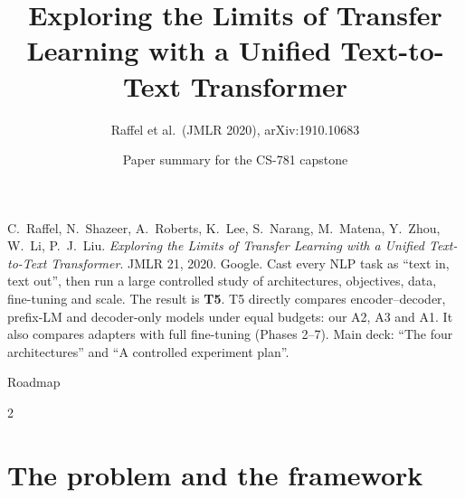 \documentclass[aspectratio=169,11pt]{beamer}
\title[T5]{Exploring the Limits of Transfer Learning with a Unified Text-to-Text Transformer}
\subtitle{Raffel et al.\ (JMLR 2020), arXiv:1910.10683}
\author[Paper summary]{Paper summary for the CS-781 capstone}
\date{}
\begin{document}
\begin{frame}\titlepage\end{frame}

\paperglance
{C.\ Raffel, N.\ Shazeer, A.\ Roberts, K.\ Lee, S.\ Narang, M.\ Matena, Y.\ Zhou, W.\ Li, P.\ J.\ Liu. \emph{Exploring the Limits of Transfer Learning with a Unified Text-to-Text Transformer}. JMLR 21, 2020. Google.}
{Cast every NLP task as ``text in, text out'', then run a large controlled study of architectures, objectives, data, fine-tuning and scale. The result is \textbf{T5}.}
{T5 directly compares encoder--decoder, prefix-LM and decoder-only models under equal budgets: our A2, A3 and A1. It also compares adapters with full fine-tuning (Phases 2--7).}
{Main deck: ``The four architectures'' and ``A controlled experiment plan''.}

\begin{frame}{Roadmap}
  \begin{multicols}{2}\small\tableofcontents\end{multicols}
\end{frame}

\section{The problem and the framework}
\end{document}
